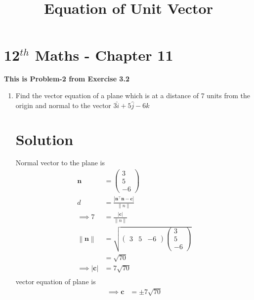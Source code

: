 \documentclass[12pt]{article}
\providecommand{\norm}[1]{\left\lVert#1\right\rVert}
\newcommand{\myvec}[1]{\ensuremath{\begin{pmatrix}#1\end{pmatrix}}}
\providecommand{\abs}[1]{\left\vert#1\right\vert}
\let\vec\mathbf
\begin{document}
\begin{center}
\title{\textbf{Equation  of Unit Vector}}
\date{\vspace{-5ex}} %
\maketitle
\end{center}
\setcounter{page}{1}
\section{12$^{th}$ Maths - Chapter 11}
\textbf{This is Problem-2 from Exercise 3.2}
\begin{enumerate}
\item Find the vector equation of a plane which is at a distance of 7 units from the origin and normal to the vector $3\hat{i}+5\hat{j}-6\hat{k}$
\section{Solution}
Normal vector to the plane is
\begin{align} 
\vec{n}&=\myvec{3\\5\\-6}\\
d&=\frac{\abs{\vec{n}^\top\vec{n}-\vec{c}}}{\norm{n}}\\
\implies7&=\frac{\abs{\vec{c}}}{\norm{n}}\\
\norm{\vec{n}}&=\sqrt{\myvec{3& 5& -6}\myvec{3\\5\\-6}}\\
&=\sqrt{70}\\
\implies\abs{\vec{c}}&=7\sqrt{70}\\
\end{align}
vector equation of plane is
\begin{align}
\implies\vec{c}&=\pm7\sqrt{70}
\end{align}	  
\end{enumerate} 
\end{document}
